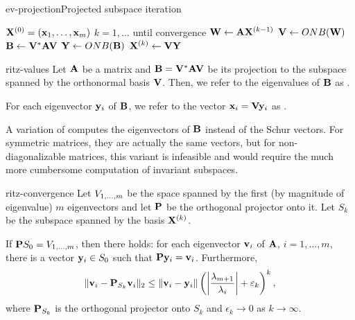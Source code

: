 
\begin{Algorithm*}{ev-projection}{Projected subspace iteration}
  \begin{algorithmic}[1]
    \Require $\matx^{(0)} = (\vx_1,\dots,\vx_m)$
    \For $k=1,\dots$ until convergence
    \State $\matw \gets \mata\matx^{(k-1)}$
    \State $\matv \gets ONB(\matw)$
    \State $\matb \gets \matv^*\mata\matv$
    \State $\maty \gets ONB(\matb)$
    \State $\matx^{(k)} \gets \matv\maty$
    \EndFor
  \end{algorithmic}
\end{Algorithm*}

\begin{Definition}{ritz-values}
  Let $\mata$ be a matrix and $\matb = \matv^*\mata\matv$ be its
  projection to the subspace spanned by the orthonormal basis
  $\matv$. Then, we refer to the eigenvalues of $\matb$ as
  .

  For each eigenvector $\vy_i$ of $\matb$, we refer to the vector
  $\vx_i = \matv\vy_i$ as .
\end{Definition}

\begin{remark}
  A variation of  computes the
  eigenvectors of $\matb$ instead of the Schur vectors. For symmetric
  matrices, they are actually the same vectors, but for
  non-diagonalizable matrices, this variant is infeasible and would
  require the much more cumbersome computation of invariant subspaces.
\end{remark}

\begin{Theorem}{ritz-convergence}
  Let $\esp{1,\dots,m}$ be the space spanned by the first (by
  magnitude of eigenvalue) $m$ eigenvectors and let $\matp$ be the
  orthogonal projector onto it. Let $S_k$ be the subspace spanned by
  the basis $\matx^{(k)}$.
  
  If $\matp S_0 = \esp{1,\dots,m}$, then there holds: for each
  eigenvector $\vv_i$ of $\mata$, $i=1,\dots,m$, there is a vector
  $\vy_i\in S_0$ such that $\matp\vy_i = \vv_i$. Furthermore,
  \begin{gather}
    \norm{\vv_i - \matp_{S_k} \vv_i}_2 \le \norm{\vv_i-\vy_i}
    \left(\abs*{\frac{\lambda_{m+1}}{\lambda_i}}+\epsilon_k\right)^k,
  \end{gather}
  where $\matp_{S_k}$ is the orthogonal projector onto $S_k$ and
  $\epsilon_k\to 0$ as $k \to \infty$.
\end{Theorem}

